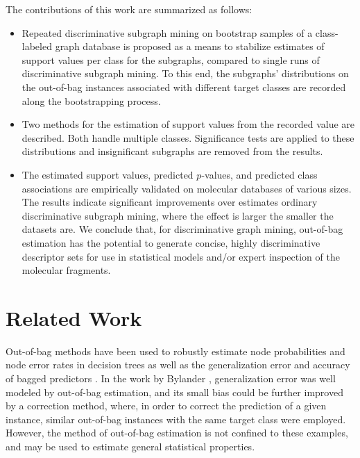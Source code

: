 \documentclass{article}
\begin{document}
The contributions of this work are summarized as follows:
\begin{itemize}
  \item Repeated discriminative subgraph mining on bootstrap samples of a
    class-labeled graph database is proposed as a means to stabilize estimates
    of support values per class for the subgraphs, compared to single runs of
    discriminative subgraph mining.  To this end, the subgraphs' distributions
    on the out-of-bag instances associated with different target classes are
    recorded along the bootstrapping process.
  \item Two methods for the estimation of support values from the recorded
    value are described. Both handle multiple classes. Significance tests are
    applied to these distributions and insignificant subgraphs are removed from
    the results.  
  \item The estimated support values, predicted $p$-values, and predicted class
    associations are empirically validated on molecular databases of various
    sizes.  The results indicate significant improvements over estimates
    ordinary discriminative subgraph mining, where the effect is larger the smaller the
    datasets are.  We conclude that, for discriminative graph mining,
    out-of-bag estimation has the potential to generate concise, highly
    discriminative descriptor sets for use in statistical models and/or expert
    inspection of the molecular fragments.
\end{itemize}


\section{Related Work}
\label{s:relatedWork}

Out-of-bag methods have been used to robustly estimate node probabilities and
node error rates in decision trees \cite{breiman96oob} as well as the
generalization error and accuracy of bagged predictors
\cite{bylander02estimating}. In the work by Bylander
\cite{bylander02estimating}, generalization error was well modeled by
out-of-bag estimation, and its small bias could be further improved by a
correction method, where, in order to correct the prediction of a given
instance, similar out-of-bag instances with the same target class were
employed. However, the method of out-of-bag estimation is not confined to these
examples, and may be used to estimate general statistical properties.
\end{document}
